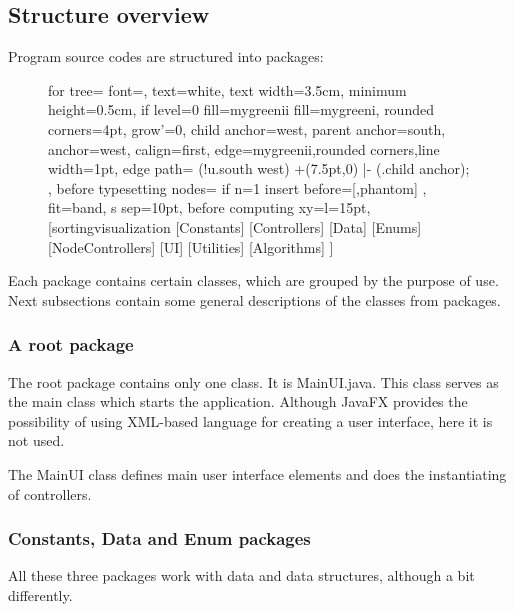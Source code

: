 \documentclass[
  field=inf,
  biblatex,
  language=english,
  glossaries,
  theorems=false,
  sourcecodes=false,
  index
]{kidiplom}
\begin{document}
\newpage
\subsection{Structure overview}

Program source codes are structured into packages:
\begin{figure}[H]
	\begin{flushleft}
		\begin{forest}
			for tree={
    		font=\sffamily,
    		text=white,
    		text width=3.5cm,
    		minimum height=0.5cm,
    		if level=0
    		  {fill=mygreenii}
    		  {fill=mygreeni},
    		rounded corners=4pt,
    		grow'=0,
    		child anchor=west,
    		parent anchor=south,
    		anchor=west,
    		calign=first,
    		edge={mygreenii,rounded corners,line width=1pt},
    		edge path={
    		  \noexpand{}
    		  (!u.south west) +(7.5pt,0) |- (.child anchor);
		    },
    		before typesetting nodes={
      		if n=1
        		{insert before={[,phantom]}}
        		{}
    		},
    		fit=band,
    		s sep=10pt,
    		before computing xy={l=15pt},
  		}
		[sortingvisualization
		  [Constants]
  		  [Controllers]
		  [Data]
		  [Enums]
		  [NodeControllers]
		  [UI]
		  [Utilities]
		  [Algorithms]
		]
		\end{forest}
	\end{flushleft}
\end{figure}

Each package contains certain classes, which are grouped by the purpose of use. Next subsections contain some general descriptions of the classes from packages. 
\subsubsection{A root package}
The root package contains only one class. It is MainUI.java. This class serves as the main class which starts the application. Although JavaFX provides the possibility of using XML-based language for creating a user interface, here it is not used. 

The MainUI class defines main user interface elements and does the instantiating of controllers.

\subsubsection{Constants, Data and Enum packages}
All these three packages work with data and data structures, although a bit differently.
\end{document}
